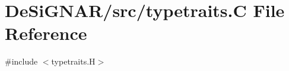 \hypertarget{typetraits_8_c}{}\section{De\+Si\+G\+N\+A\+R/src/typetraits.C File Reference}
\label{typetraits_8_c}
{\ttfamily \#include $<$typetraits.\+H$>$}\newline

